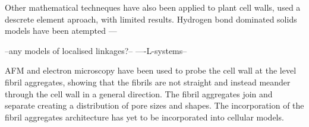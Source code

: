Other mathematical techneques have also been applied to plant cell walls, \cite{HEPWORTH_1998} used a descrete element aproach, with limited results. Hydrogen bond dominated solids models have been atempted ---

--any models of localised linkages?--
----L-systems--

AFM and electron microscopy have been used to probe the cell wall at the level fibril aggregates, showing that the fibrils are not straight and instead meander through the cell wall in a general direction. The fibril aggregates join and separate creating a distribution of pore sizes and shapes. The incorporation of the fibril aggregates architecture has yet to be incorporated into cellular models. 